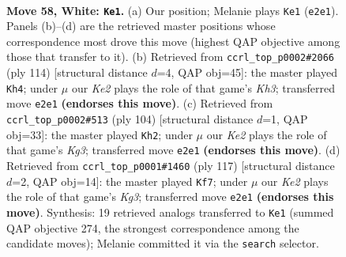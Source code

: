 \documentclass[11pt]{article}
\begin{document}
\clearpage

\begin{figure}[p]\centering
\begin{subfigure}{0.46\textwidth}\centering
\resizebox{\linewidth}{!}{%
\newchessgame
\chessboard[
  setfen={5k2/8/8/1P6/R3p1r1/8/4K3/8 w - - 1 58},
  showmover=false,
  pgfstyle=straightmove, color=movearrow, markmove={e2-e1}
]}
\caption{}
\end{subfigure}\hfill
\begin{subfigure}{0.46\textwidth}\centering
\resizebox{\linewidth}{!}{%
\newchessgame
\chessboard[
  setfen={8/R3p1r1/4P3/8/4k3/7K/8/8 w - - 19 58},
  showmover=false,
  pgfstyle=straightmove, color=movearrow, markmove={h3-h4}
]}
\caption{}
\end{subfigure}
\\[4pt]
\begin{subfigure}{0.46\textwidth}\centering
\resizebox{\linewidth}{!}{%
\newchessgame
\chessboard[
  setfen={8/4k3/8/3rp3/8/P5K1/4R3/8 w - - 2 53},
  showmover=false,
  pgfstyle=straightmove, color=movearrow, markmove={g3-h2}
]}
\caption{}
\end{subfigure}\hfill
\begin{subfigure}{0.46\textwidth}\centering
\resizebox{\linewidth}{!}{%
\newchessgame
\chessboard[
  setfen={r7/P7/6k1/8/4K2p/8/R7/8 b - - 1 59},
  showmover=false,
  pgfstyle=straightmove, color=movearrow, markmove={g6-f7}
]}
\caption{}
\end{subfigure}
\caption{\textbf{Move 58, White: \texttt{Ke1}.} (a) Our position; Melanie plays \texttt{Ke1} (\texttt{e2e1}). Panels (b)--(d) are the retrieved master positions whose correspondence most drove this move (highest QAP objective among those that transfer to it). (b) Retrieved from \texttt{ccrl\_top\_p0002\#2066} (ply 114) [structural distance $d$=4, QAP obj=45]: the master played \texttt{Kh4}; under $\mu$ our \emph{Ke2} plays the role of that game's \emph{Kh3}; transferred move \texttt{e2e1} \textbf{(endorses this move)}. (c) Retrieved from \texttt{ccrl\_top\_p0002\#513} (ply 104) [structural distance $d$=1, QAP obj=33]: the master played \texttt{Kh2}; under $\mu$ our \emph{Ke2} plays the role of that game's \emph{Kg3}; transferred move \texttt{e2e1} \textbf{(endorses this move)}. (d) Retrieved from \texttt{ccrl\_top\_p0001\#1460} (ply 117) [structural distance $d$=2, QAP obj=14]: the master played \texttt{Kf7}; under $\mu$ our \emph{Ke2} plays the role of that game's \emph{Kg3}; transferred move \texttt{e2e1} \textbf{(endorses this move)}. Synthesis: 19 retrieved analogs transferred to \texttt{Ke1} (summed QAP objective 274, the strongest correspondence among the candidate moves); Melanie committed it via the \texttt{search} selector.}
\label{fig:thought-m114}
\end{figure}
\end{document}
